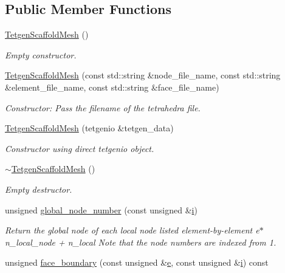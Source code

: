 \subsection*{Public Member Functions}
\begin{DoxyCompactItemize}
\item 
\hyperlink{classoomph_1_1TetgenScaffoldMesh_a2262991306aa1fa98463e2bdf85ac518}{Tetgen\+Scaffold\+Mesh} ()
\begin{DoxyCompactList}\small\item\em Empty constructor. \end{DoxyCompactList}\item 
\hyperlink{classoomph_1_1TetgenScaffoldMesh_abeb97f979ddf97f8b7690c9a53082e13}{Tetgen\+Scaffold\+Mesh} (const std\+::string \&node\+\_\+file\+\_\+name, const std\+::string \&element\+\_\+file\+\_\+name, const std\+::string \&face\+\_\+file\+\_\+name)
\begin{DoxyCompactList}\small\item\em Constructor\+: Pass the filename of the tetrahedra file. \end{DoxyCompactList}\item 
\hyperlink{classoomph_1_1TetgenScaffoldMesh_aaafa633cb5bb15366edcfe49804b5f6f}{Tetgen\+Scaffold\+Mesh} (tetgenio \&tetgen\+\_\+data)
\begin{DoxyCompactList}\small\item\em Constructor using direct tetgenio object. \end{DoxyCompactList}\item 
\hyperlink{classoomph_1_1TetgenScaffoldMesh_a7f6b1814f536bd153231c9fb076c614b}{$\sim$\+Tetgen\+Scaffold\+Mesh} ()
\begin{DoxyCompactList}\small\item\em Empty destructor. \end{DoxyCompactList}\item 
unsigned \hyperlink{classoomph_1_1TetgenScaffoldMesh_aa608b06d59df775fa51924d1c68e9d2b}{global\+\_\+node\+\_\+number} (const unsigned \&\hyperlink{cfortran_8h_adb50e893b86b3e55e751a42eab3cba82}{i})
\begin{DoxyCompactList}\small\item\em Return the global node of each local node listed element-\/by-\/element e$\ast$n\+\_\+local\+\_\+node + n\+\_\+local Note that the node numbers are indexed from 1. \end{DoxyCompactList}\item 
unsigned \hyperlink{classoomph_1_1TetgenScaffoldMesh_a44fcd8871bd1441ed353fd86fac7015c}{face\+\_\+boundary} (const unsigned \&\hyperlink{cfortran_8h_a37cd013acc76697829c324bdd8562d82}{e}, const unsigned \&\hyperlink{cfortran_8h_adb50e893b86b3e55e751a42eab3cba82}{i}) const

\end{DoxyCompactItemize}
